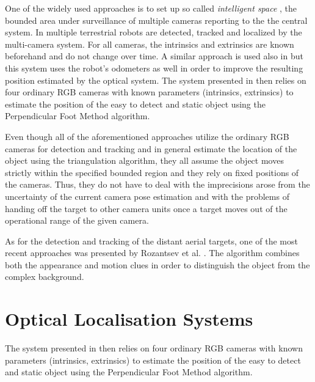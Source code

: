 One of the widely used approaches is to set up so called \textit{intelligent space} \cite{intelligentSpace}, the bounded area under surveillance of multiple cameras reporting to the the central system. In \cite{Multi-Camera_Sensor_System_for_3D_Segmentation} multiple terrestrial robots are detected, tracked and localized by the multi-camera system. For all cameras, the intrinsics and extrinsics are known beforehand and do not change over time.  A similar approach is used also in \cite{Localization_and_Geometric_Reconstruction_of_Mobile_Robots} but this system uses the robot's odometers as well in order to improve the resulting position estimated by the optical system. The system presented in \cite{A_3D_visual_localization} then relies on four ordinary RGB cameras with known parameters (intrinsics, extrinsics) to estimate the position of the easy to detect and static object using the Perpendicular Foot Method algorithm.

Even though all of the aforementioned approaches utilize the ordinary RGB cameras for detection and tracking and in general estimate the location of the object using the triangulation algorithm, they all assume the object moves strictly within the specified bounded region and they rely on fixed positions of the cameras. Thus, they do not have to deal with the imprecisions arose from the uncertainty of the current camera pose estimation and with the problems of handing off the target to other camera units once a target moves out of the operational range of the given camera. 

As for the detection and tracking of the distant aerial targets, one of the most recent approaches was presented by Rozantsev et al. \cite{DBLP:journals/corr/RozantsevLF14}. The algorithm combines both the appearance and motion clues in order to distinguish the object from the complex background.



\section{Optical Localisation Systems}

The system presented in \cite{A_3D_visual_localization} then relies on four ordinary RGB cameras with known parameters (intrinsics, extrinsics) to estimate the position of the easy to detect and static object using the Perpendicular Foot Method algorithm. 



